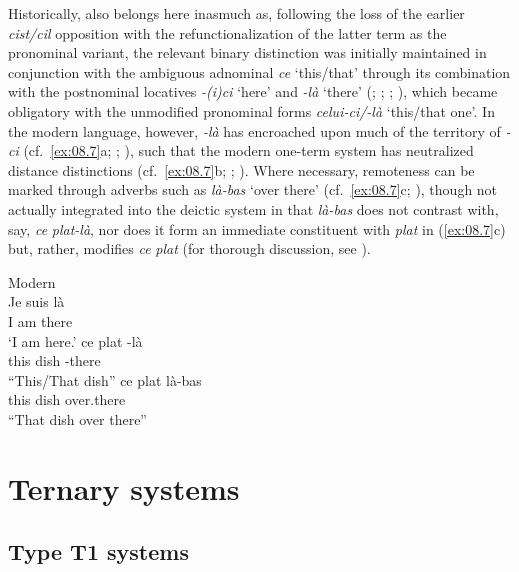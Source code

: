\documentclass[output=paper]{langsci/langscibook}
\begin{document}
Historically,  also belongs here inasmuch as, following the loss of the
earlier \emph{cist/cil} opposition with the refunctionalization of the latter
term as the pronominal variant, the relevant binary distinction was initially
maintained in conjunction with the ambiguous adnominal \emph{ce} ‘this/that’
through its combination with the postnominal locatives
\emph{\nobreakdash-(i)ci} ‘here’ and \emph{{}-là} ‘there’
(\citealt[325]{Brunot:1899a}; \citealt[424f]{Nyrop:1925a};
\citealt[292f]{Nyrop:1925ab}; \citealt[123, 126]{Price:1971a}), which became
obligatory with the unmodified pronominal forms \emph{celui\nobreakdash-ci/-là}
‘this/that one’. In the modern language, however, \emph{\nobreakdash-là} has
encroached upon much of the territory of \emph{{}-ci} (cf.\ \ref{ex:08.7}a;
\citealt[127]{Price:1971a}; \citealt[§2]{Smith:1995a}), such
that the modern  one-term system has neutralized distance distinctions
(cf.\ \ref{ex:08.7}b; \citealt[§3.4]{Da-Milano:2007a}; \citealt[67f]{Rowlett:2007a}).
Where necessary, remoteness can be marked through adverbs such as \emph{là-bas}
‘over there’ (cf.\ \ref{ex:08.7}c; \citealt{Brault:2004a}), though not actually
integrated into the deictic system in that \emph{là-bas} does not contrast
with, say, \emph{ce} \emph{plat-là}, nor does it form an immediate constituent
with \emph{plat} in (\ref{ex:08.7}c) but, rather, modifies \emph{ce}
\emph{plat} (for thorough discussion, see \citealt[n.5]{Smith:1995a}).

\ea\label{ex:08.7}Modern  \citep{Smith:1995a}\\
\ea
\gll  Je  suis  là\\
I  am  there\\
\glt \enquote*{I am here.}
\ex
\gll  ce  plat  {}-là\\
this  dish  {}-there\\
\glt \enquote{This/That dish}
\ex
\gll  ce  plat  là-bas\\
this  dish  over.there\\
\glt \enquote{That dish over there}
\z
\z

\section{Ternary systems}\label{bkm:Ref370483101}

\subsection{Type T1 systems}
\end{document}
